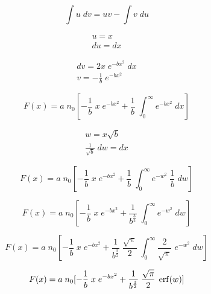 \documentclass[11pt,a4paper]{article}
\begin{document}
\begin{equation*}
    \int u \; dv = uv - \int v \; du
\end{equation*}

\begin{equation*}
    \begin{gathered}
        u = x\\
        du = dx
    \end{gathered}
\end{equation*}

\begin{equation*}
    \begin{gathered}
        dv = 2x \; e^{-bx^2} \; dx\\
        v = -\frac{1}{b} \; e^{-bx^2}
    \end{gathered}
\end{equation*}

\begin{equation}
    F(x) = a \; n_0 [-\frac{1}{b} \; x \; e^{-bx^2} + \frac{1}{b} \; \int_0^{\infty} e^{-bx^2} \; dx]
\end{equation}

\begin{equation*}
    \begin{gathered}
        w = x\sqrt{b}\\
        \frac{1}{\sqrt{b}} \; dw = dx
    \end{gathered}
\end{equation*}

\begin{equation}
    F(x) = a \; n_0 [-\frac{1}{b} \; x \; e^{-bx^2} + \frac{1}{b} \; \int_0^{\infty} e^{-w^2} \; \frac{1}{b} \; dw]
\end{equation}

\begin{equation}
    F(x) = a \; n_0 [-\frac{1}{b} \; x \; e^{-bx^2} + \frac{1}{b^{\frac{3}{2}}} \; \int_0^{\infty} e^{-w^2} \; dw]
\end{equation}

\begin{equation}
    F(x) = a \; n_0 [-\frac{1}{b} \; x \; e^{-bx^2} + \frac{1}{b^{\frac{3}{2}}} \; \frac{\sqrt{\pi}}{2} \; \int_0^{\infty} \frac{2}{\sqrt{\pi}} \; e^{-w^2} \; dw]
\end{equation}

\begin{equation}
    F(x) = a \; n_0 [-\frac{1}{b} \; x \; e^{-bx^2} + \frac{1}{b^{\frac{3}{2}}} \; \frac{\sqrt{\pi}}{2} \; \erf(w)]
\end{equation}
\end{document}
